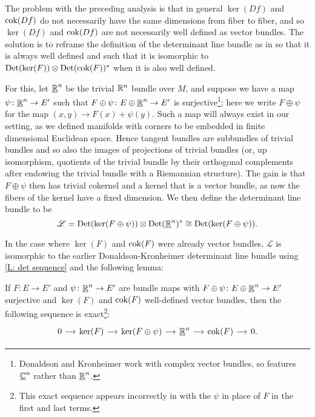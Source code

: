 The problem with the preceding analysis is that in general $\ker(Df)$ and ${\rm cok}(Df)$ do not necessarily have the same dimensions from fiber to fiber, and so $\ker(Df)$ and ${\rm cok}(Df)$ are not necessarily well defined as vector bundles.
The solution is to reframe the definition of the determinant line bundle as in \cite{DoKr90} so that it is always well defined and such that it is isomorphic to ${\rm Det}(\ker(F)) \otimes {\rm Det}({\rm cok}(F))^*$ when it is also well defined.

For this, let $\underline{\mathbb{R}}^n$ be the trivial $\mathbb{R}^n$ bundle over $M$, and suppose we have a map $\psi \colon \underline{\mathbb{R}}^n \to E'$ such that $F \oplus \psi \colon E \oplus \underline{\mathbb{R}}^n \to E'$ is surjective\footnote{Donaldson and Kronheimer work with complex vector bundles, so \cite{DoKr90} features $\underline{\mathbb{C}}^n$ rather than $\underline{\mathbb{R}}^n$.}; here we write $F \oplus \psi$ for the map $(x,y) \to F(x) + \psi(y)$.
Such a map will always exist in our setting, as we defined manifolds with corners to be embedded in finite dimensional Euclidean space.
Hence tangent bundles are subbundles of trivial bundles and so also the images of projections of trivial bundles (or, up isomorphism, quotients of the trivial bundle by their orthogonal complements after endowing the trivial bundle with a Riemannian structure).
The gain is that $F \oplus \psi$ then has trivial cokernel and a kernel that is a vector bundle, as now the fibers of the kernel have a fixed dimension.
We then define the determinant line bundle to be
$$\mathscr L = {\rm Det}(\ker(F \oplus \psi)) \otimes {\rm Det}(\underline{\mathbb{R}}^n)^* \cong {\rm Det}(\ker(F \oplus \psi)).$$

In the case where $\ker(F)$ and ${\rm cok}(F)$ were already vector bundles, $\mathscr L$ is isomorphic to the earlier Donaldson-Kronheimer determinant line bundle using \cref{L: det sequence} and the following lemma:

\begin{lemma}
	If $F \colon E \to E'$ and $\psi \colon \underline{\mathbb{R}}^n \to E'$ are bundle maps with $F \oplus \psi \colon E \oplus \underline{\mathbb{R}}^n \to E'$ surjective and $\ker(F)$ and ${\rm cok}(F)$ well-defined vector bundles, then the following sequence is exact\footnote{This exact sequence appears incorrectly in \cite{DoKr90} with the $\psi$ in place of $F$ in the first and last terms.}:
	\[
	\begin{tikzcd}[column sep=small]
		0 \arrow[r] & \ker(F) \arrow[r] & \ker(F \oplus \psi) \arrow[r] & \underline{\R}^n \arrow[r] & \cok(F) \arrow[r] & 0.
	\end{tikzcd}
	\]
\end{lemma}

